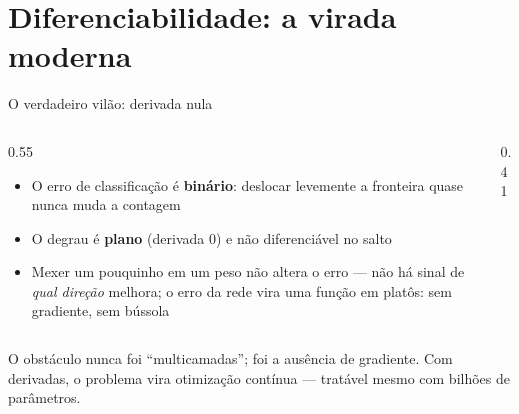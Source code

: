 \documentclass[aspectratio=169, 11pt]{beamer}
\begin{document}
\section{Diferenciabilidade: a virada moderna}

\begin{frame}{O verdadeiro vilão: derivada nula}
  \begin{columns}[T]
    \begin{column}{0.55\textwidth}
      \begin{itemize}\setlength{\itemsep}{0.4ex}
        \item O erro de classificação é \textbf{binário}: deslocar levemente a
              fronteira quase nunca muda a contagem
        \item O degrau é \textbf{plano} (derivada $0$) e não diferenciável
              no salto
        \item Mexer um pouquinho em um peso \alert{não altera o erro} — não há
              sinal de \emph{qual direção} melhora; o erro da rede vira uma
              função em platôs: sem gradiente, sem bússola
      \end{itemize}
    \end{column}
    \begin{column}{0.41\textwidth}
      \begin{center}
      \end{center}
    \end{column}
  \end{columns}

  \begin{alertabox}
    O obstáculo nunca foi ``multicamadas''; foi \alert{a ausência de gradiente}.
    Com derivadas, o problema vira otimização contínua — tratável mesmo com
    bilhões de parâmetros.
  \end{alertabox}
\end{frame}
\end{document}
